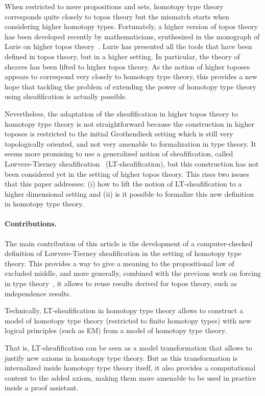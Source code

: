 \documentclass[preprint,9pt,numbers]{sigplanconf}
\begin{document}
When restricted to mere propositions and sets, homotopy type
theory corresponds quite closely to topos theory but the mismatch
starts when considering higher homotopy types.
%
Fortunately, a higher version of topos theory has been developed
recently by mathematicians, synthesized in the monograph of Lurie on
higher topos theory~\cite{lurie}. 
%
Lurie has presented all the tools that have been defined in
topos theory, but in a higher setting. In particular, the theory of
sheaves has been lifted to higher topos theory.
%
As the notion of higher toposes appears to correspond very closely to
homotopy type theory, this provides a new hope that tackling the
problem of extending the power of homotopy type theory using
sheafification is actually possible.

Nevertheless, the adaptation of the sheafification in higher topos
theory to homotopy type theory is not straightforward because the
construction in higher toposes is restricted to the initial Grothendieck
setting which is still very topologically oriented, and not very
amenable to formalization in type theory. It seems more promising to
use a generalized notion of sheafification, called Lawvere-Tierney
sheafification~\cite{tierney1972sheaf,maclanemoerdijk}
(LT-sheafification), but this construction has not
been considered yet in the setting of higher topos theory. This rises
two issues that this paper addresses: (i) how to lift the notion of
LT-sheafification to a higher dimensional setting and (ii) is it
possible to formalize this new definition in homotopy type theory.

\paragraph*{Contributions.}

The main contribution of this article is the development of a
computer-checked definition of Lawvere-Tierney sheafification in the
setting of homotopy type theory.
%
This provides a way to give a meaning to the propositional law of
excluded middle, and more generally, combined with the previous work on
forcing in type theory~\cite{jaber2012extending}, it allows to reuse
results derived for topos theory, such as independence results.

Technically, LT-sheafification in homotopy type theory allows to
construct a model of homotopy type theory (restricted to finite homotopy
types) with new logical principles (such as EM) from a model of
homotopy type theory.

That is, LT-sheafification can be seen as a model transformation that
allows to justify new axioms in homotopy type theory. 
%
But as this transformation is internalized inside homotopy type theory
itself, it also provides a computational content to the added axiom,
making them more amenable to be used in practice inside a proof
assistant. 
\end{document}
